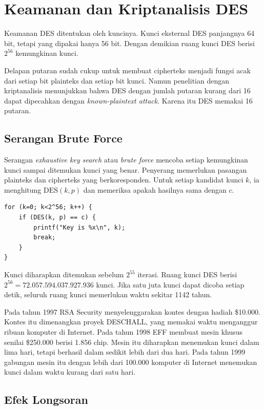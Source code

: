 \section{Keamanan dan Kriptanalisis DES}
\label{sec:keamanan-des}

Keamanan DES ditentukan oleh kuncinya. Kunci eksternal DES panjangnya 64 bit,
tetapi yang dipakai hanya 56 bit. Dengan demikian ruang kunci DES berisi
$2^{56}$ kemungkinan kunci.

Delapan putaran sudah cukup untuk membuat cipherteks menjadi fungsi acak dari
setiap bit plainteks dan setiap bit kunci. Namun penelitian dengan
kriptanalisis menunjukkan bahwa DES dengan jumlah putaran kurang dari 16 dapat
dipecahkan dengan \textit{known-plaintext attack}. Karena itu DES memakai
16 putaran.

\subsection{Serangan Brute Force}

Serangan \textit{exhaustive key search} atau \textit{brute force} mencoba
setiap kemungkinan kunci sampai ditemukan kunci yang benar. Penyerang
memerlukan pasangan plainteks dan cipherteks yang berkoresponden. Untuk setiap
kandidat kunci $k$, ia menghitung $\mathrm{DES}(k,p)$ dan memeriksa apakah
hasilnya sama dengan $c$.

\begin{verbatim}
for (k=0; k<2^56; k++) {
    if (DES(k, p) == c) {
        printf("Key is %x\n", k);
        break;
    }
}
\end{verbatim}

Kunci diharapkan ditemukan sebelum $2^{55}$ iterasi. Ruang kunci DES berisi
$2^{56} = 72.057.594.037.927.936$ kunci. Jika satu juta kunci dapat dicoba
setiap detik, seluruh ruang kunci memerlukan waktu sekitar 1142 tahun.

Pada tahun 1997 RSA Security menyelenggarakan kontes dengan hadiah \$10.000.
Kontes itu dimenangkan proyek DESCHALL, yang memakai waktu menganggur ribuan
komputer di Internet. Pada tahun 1998 EFF membuat mesin khusus senilai
\$250.000 berisi 1.856 chip. Mesin itu diharapkan menemukan kunci dalam lima
hari, tetapi berhasil dalam sedikit lebih dari dua hari. Pada tahun 1999
gabungan mesin itu dengan lebih dari 100.000 komputer di Internet menemukan
kunci dalam waktu kurang dari satu hari.

\subsection{Efek Longsoran}

